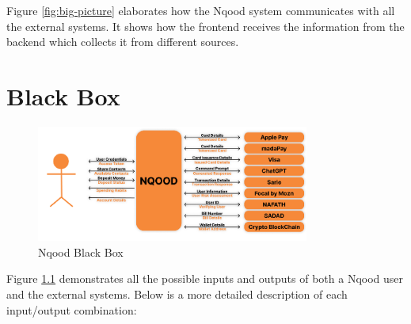 \documentclass[a4paper]{report}
\begin{document}
Figure \ref{fig:big-picture} elaborates how the Nqood system communicates with all the external systems. It shows how the frontend receives the information from the backend which collects it from different sources.

\chapter{Black Box}

\begin{figure}[h!]
    \centering
    \includegraphics[width=0.8\textwidth]{images/nqood-black-box.png}
    \caption{Nqood Black Box}
    \label{fig:black-box}
\end{figure}

Figure \ref{fig:black-box} demonstrates all the possible inputs and outputs of both a Nqood user and the external systems. Below is a more detailed description of each input/output combination:
\end{document}
